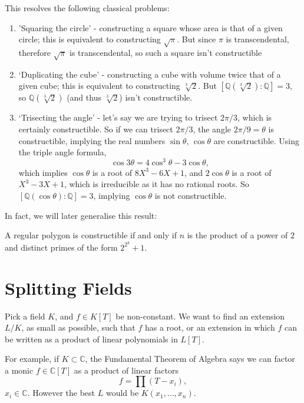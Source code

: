 \documentclass[12pt]{article}
\begin{document}
This resolves the following classical problems:

\begin{enumerate}[1.]
	\item 'Squaring the circle' - constructing a square whose area is that of a given circle; this is equivalent to constructing $\sqrt{\pi}$. But since $\pi$ is transcendental, therefore $\sqrt \pi$ is transcendental, so such a square isn't constructible
	\item `Duplicating the cube' - constructing a cube with volume twice that of a given cube; this is equivalent to constructing $\sqrt[3]{2}$. But $[\mathbb{Q}(\sqrt[3]{2}) : \mathbb{Q}] = 3$, so $\mathbb{Q}(\sqrt[3]{2})$ (and thus $\sqrt[3]{2}$) isn't constructible.
	\item `Trisecting the angle' - let's say we are trying to trisect $2\pi/3$, which is certainly constructible. So if we can trisect $2\pi/3$, the angle $2\pi/9 = \theta$ is constructible, implying the real numbers $\sin \theta$, $\cos \theta$ are constructible. Using the triple angle formula,
		\[
		\cos 3 \theta = 4 \cos^3 \theta - 3 \cos \theta
		,\]
		which implies $\cos \theta$ is a root of $8X^3 - 6X + 1$, and $2 \cos \theta$ is a root of $X^3 - 3X + 1$, which is irreducible as it has no rational roots. So $[\mathbb{Q}(\cos \theta) : \mathbb{Q}] = 3$, implying $\cos \theta$ is not constructible.
\end{enumerate}

In fact, we will later generalise this result:
\begin{theorem}[Gauss]
	A regular polygon is constructible if and only if $n$ is the product of a power of $2$ and distinct primes of the form $2^{2^{k}} + 1$.
\end{theorem}


\newpage

\section{Splitting Fields}%
\label{sec:splitting_fields}

Pick a field $K$, and $f \in K[T]$ be non-constant. We want to find an extension $L/K$, as small as possible, such that $f$ has a root, or an extension in which $f$ can be written as a product of linear polynomials in $L[T]$.

For example, if $K \subset \mathbb{C}$, the Fundamental Theorem of Algebra says we can factor a monic $f \in \mathbb{C}[T]$ as a product of linear factors
\[
	f = \prod (T - x_i)
,\]
$x_i \in \mathbb{C}$. However the best $L$ would be $K(x_1, \ldots, x_n)$.
\end{document}
